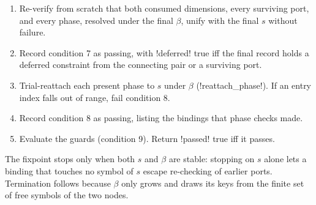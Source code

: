 \begin{algorithm}
\begin{enumerate}
\begin{enumerate}
    non-concrete dimension fails the resolution: condition 7 is reported passing from the
    port-verified snapshot, condition 8 failing with a cause-specific detail, condition 9 failing.
  \item After every successful unification that binds: merge the concrete bindings into $\beta$
    (a rebinding of a symbol to a different concrete value fails the candidate) and substitute
    them into $s$.
  \item Stop when a full pass changes neither $s$ nor $\beta$.
  \end{enumerate}
  Any unification failure in (a) or (b) fails conditions 7 and 8 with a detail naming the side.
  When the budget runs out, both fail with a budget-exhaustion detail.
\item Re-verify from scratch that both consumed dimensions, every surviving port, and every
  phase, resolved under the final $\beta$, unify with the final $s$ without failure.
\item Record condition 7 as passing, with \py!deferred! true iff the final record holds a
  deferred constraint from the connecting pair or a surviving port.
\item Trial-reattach each present phase to $s$ under $\beta$ (\py!reattach_phase!). If an entry
  index falls out of range, fail condition 8.
\item Record condition 8 as passing, listing the bindings that phase checks made.
\item Evaluate the guards (condition 9). Return \py!passed! true iff it passes.
\end{enumerate}
\end{algorithm}

The fixpoint stops only when both $s$ and $\beta$ are stable: stopping on $s$ alone lets a binding
that touches no symbol of $s$ escape re-checking of earlier ports. Termination follows because
$\beta$ only grows and draws its keys from the finite set of free symbols of the two nodes.

